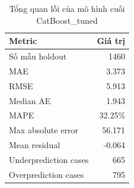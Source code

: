 \begin{table}[H]
\centering
\caption{Tổng quan lỗi của mô hình cuối CatBoost\_tuned}
\label{tab:error-overview}
\footnotesize
\setlength{\tabcolsep}{6pt}
\renewcommand{\arraystretch}{0.95}
\begin{tabular}{lr}
\toprule
Metric & Giá trị \\
\midrule
Số mẫu holdout & 1460 \\
MAE & 3.373 \\
RMSE & 5.913 \\
Median AE & 1.943 \\
MAPE & 32.25\% \\
Max absolute error & 56.171 \\
Mean residual & -0.064 \\
Underprediction cases & 665 \\
Overprediction cases & 795 \\
\bottomrule
\end{tabular}
\end{table}
